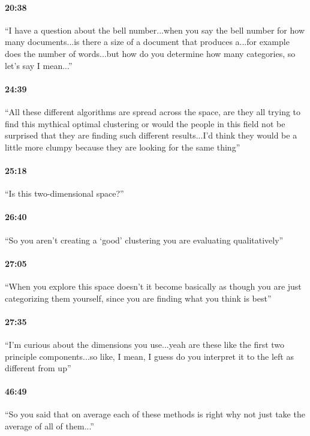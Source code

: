 \documentclass[11pt]{article}
\begin{document}
\paragraph{20:38} ``I have a question about the bell number...when you say the bell number for how many documents...is there a size of a document that produces a...for example does the number of words...but how do you determine how many categories, so let's say I mean...''

\paragraph{24:39} ``All these different algorithms are spread across the space, are they all trying to find this mythical optimal clustering or would the people in this field not be surprised that they are finding such different results...I'd think they would be a little more clumpy because they are looking for the same thing''

\paragraph{25:18} ``Is this two-dimensional space?''

\paragraph{26:40} ``So you aren't creating a `good' clustering you are evaluating qualitatively''

\paragraph{27:05} ``When you explore this space doesn't it become basically as though you are just categorizing them yourself, since you are finding what you think is best''

\paragraph{27:35} ``I'm curious about the dimensions you use...yeah are these like the first two principle components...so like, I mean, I guess do you interpret it to the left as different from up''

\paragraph{46:49} ``So you said that on average each of these methods is right why not just take the average of all of them...''
\end{document}
